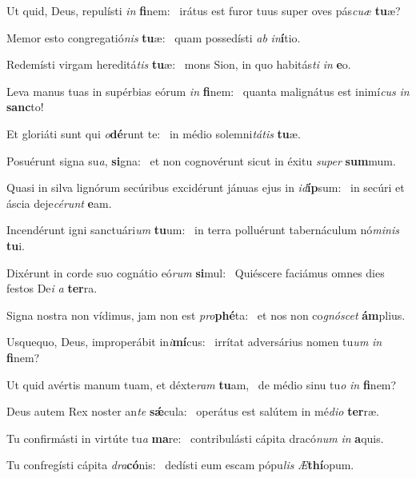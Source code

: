 \item Ut quid, Deus, repulísti \textit{in} \textbf{fi}nem:~\psstar{} irátus est furor tuus super oves pás\textit{cu}\textit{æ} \textbf{tu}æ?
\item Memor esto congregatió\textit{nis} \textbf{tu}æ:~\psstar{} quam possedísti \textit{ab} \textit{in}\textbf{í}tio.
\item Redemísti virgam hereditá\textit{tis} \textbf{tu}æ:~\psstar{} mons Sion, in quo habitás\textit{ti} \textit{in} \textbf{e}o.
\item Leva manus tuas in supérbias eórum \textit{in} \textbf{fi}nem:~\psstar{} quanta malignátus est inimí\textit{cus} \textit{in} \textbf{sanc}to!
\item Et gloriáti sunt qui \textit{o}\textbf{dé}runt te:~\psstar{} in médio solemni\textit{tá}\textit{tis} \textbf{tu}æ.
\item Posuérunt signa su\textit{a}, \textbf{si}gna:~\psstar{} et non cognovérunt sicut in éxitu \textit{su}\textit{per} \textbf{sum}mum.
\item Quasi in silva lignórum secúribus excidérunt jánuas ejus in \textit{id}\textbf{íp}sum:~\psstar{} in secúri et áscia deje\textit{cé}\textit{runt} \textbf{e}am.
\item Incendérunt igni sanctuári\textit{um} \textbf{tu}um:~\psstar{} in terra polluérunt tabernáculum nó\textit{mi}\textit{nis} \textbf{tu}i.
\item Dixérunt in corde suo cognátio eó\textit{rum} \textbf{si}mul:~\psstar{} Quiéscere faciámus omnes dies festos De\textit{i} \textit{a} \textbf{ter}ra.
\item Signa nostra non vídimus, jam non est \textit{pro}\textbf{phé}ta:~\psstar{} et nos non co\textit{gnó}\textit{scet} \textbf{ám}plius.
\item Usquequo, Deus, improperábit in\textit{i}\textbf{mí}cus:~\psstar{} irrítat adversárius nomen tu\textit{um} \textit{in} \textbf{fi}nem?
\item Ut quid avértis manum tuam, et déxte\textit{ram} \textbf{tu}am,~\psstar{} de médio sinu tu\textit{o} \textit{in} \textbf{fi}nem?
\item Deus autem Rex noster an\textit{te} \textbf{sǽ}cula:~\psstar{} operátus est salútem in mé\textit{di}\textit{o} \textbf{ter}ræ.
\item Tu confirmásti in virtúte tu\textit{a} \textbf{ma}re:~\psstar{} contribulásti cápita dracó\textit{num} \textit{in} \textbf{a}quis.
\item Tu confregísti cápita \textit{dra}\textbf{có}nis:~\psstar{} dedísti eum escam pópu\textit{lis} \textit{Æ}\textbf{thí}opum.
